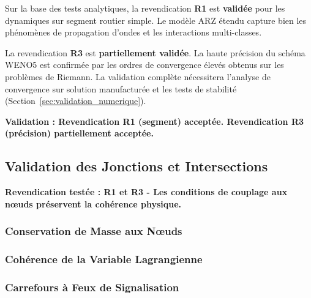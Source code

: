 Sur la base des tests analytiques, la revendication \textbf{R1} est \textbf{validée} pour les dynamiques sur segment routier simple. Le modèle ARZ étendu capture bien les phénomènes de propagation d'ondes et les interactions multi-classes.

La revendication \textbf{R3} est \textbf{partiellement validée}. La haute précision du schéma WENO5 est confirmée par les ordres de convergence élevés obtenus sur les problèmes de Riemann. La validation complète nécessitera l'analyse de convergence sur solution manufacturée et les tests de stabilité (Section~\ref{sec:validation_numerique}).

\textbf{Validation : Revendication R1 (segment) acceptée. Revendication R3 (précision) partiellement acceptée.}

\subsection{Validation des Jonctions et Intersections}
\label{sec:validation_jonctions}

\textbf{Revendication testée : R1 et R3 - Les conditions de couplage aux nœuds préservent la cohérence physique.}

\subsubsection{Conservation de Masse aux Nœuds}
\label{subsec:conservation_masse_noeuds}

\subsubsection{Cohérence de la Variable Lagrangienne}
\label{subsec:coherence_variable_w}

\subsubsection{Carrefours à Feux de Signalisation}
\label{subsec:carrefours_feux}

